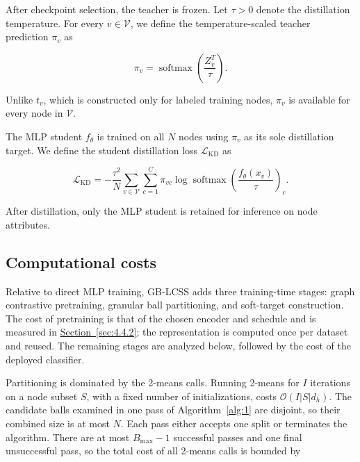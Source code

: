 \documentclass[10pt,letterpaper,nopreprintline]{elsarticle}
\theoremstyle{plain}
\begin{document}
After checkpoint selection, the teacher is frozen. Let \(\tau > 0\) denote the distillation temperature. For every \(v \in \mathcal{V}\), we define the temperature-scaled teacher prediction \(\pi_{v}\) as

\begin{equation}\label{eq:20}
\pi_{v} = \operatorname{softmax}\left( \frac{Z_{v}^{T}}{\tau} \right).
\end{equation}

Unlike \(t_{v}\), which is constructed only for labeled training nodes, \(\pi_{v}\) is available for every node in \(\mathcal{V}\).

\Needspace{64pt}

The MLP student \(f_{\theta}\) is trained on all \(N\) nodes using \(\pi_{v}\) as its sole distillation target. We define the student distillation loss \(\mathcal{L}_{\mathrm{KD}}\) as

\begin{equation}\label{eq:21}
\mathcal{L}_{\mathrm{KD}} = - \frac{\tau^{2}}{N}\sum_{v \in \mathcal{V}}{\sum_{c = 1}^{C}\pi_{vc}}\log\operatorname{softmax}\left( \frac{f_{\theta}(x_{v})}{\tau} \right)_{c}.
\end{equation}

After distillation, only the MLP student is retained for inference on node attributes.

\subsection{Computational costs}\label{sec:3.6}

Relative to direct MLP training, GB-LCSS adds three training-time stages: graph contrastive pretraining, granular ball partitioning, and soft-target construction. The cost of pretraining is that of the chosen encoder and schedule and is measured in \hyperref[sec:4.4.2]{Section~\ref*{sec:4.4.2}}; the representation is computed once per dataset and reused. The remaining stages are analyzed below, followed by the cost of the deployed classifier.

\Needspace{64pt}

Partitioning is dominated by the 2-means calls. Running 2-means for \(I\) iterations on a node subset \(S\), with a fixed number of initializations, costs \(\mathcal{O}(I|S|d_{h})\). The candidate balls examined in one pass of Algorithm~\ref{alg:1} are disjoint, so their combined size is at most \(N\). Each pass either accepts one split or terminates the algorithm. There are at most \(B_{\max}-1\) successful passes and one final unsuccessful pass, so the total cost of all 2-means calls is bounded by
\end{document}
